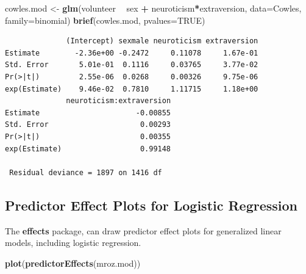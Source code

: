 \documentclass[
]{article}
\newenvironment{Shaded}{\begin{snugshade}}{\end{snugshade}}
\newcommand{\DataTypeTok}[1]{\textcolor[rgb]{0.13,0.29,0.53}{#1}}
\newcommand{\KeywordTok}[1]{\textcolor[rgb]{0.13,0.29,0.53}{\textbf{#1}}}
\newcommand{\NormalTok}[1]{#1}
\newcommand{\OperatorTok}[1]{\textcolor[rgb]{0.81,0.36,0.00}{\textbf{#1}}}
\newcommand{\OtherTok}[1]{\textcolor[rgb]{0.56,0.35,0.01}{#1}}
\newcommand{\StringTok}[1]{\textcolor[rgb]{0.31,0.60,0.02}{#1}}
\begin{document}
\begin{Shaded}
\begin{Highlighting}[]
\NormalTok{cowles.mod <-}\StringTok{ }\KeywordTok{glm}\NormalTok{(volunteer }\OperatorTok{~}\StringTok{ }\NormalTok{sex }\OperatorTok{+}\StringTok{ }\NormalTok{neuroticism}\OperatorTok{*}\NormalTok{extraversion,}
    \DataTypeTok{data=}\NormalTok{Cowles, }\DataTypeTok{family=}\NormalTok{binomial)}
\KeywordTok{brief}\NormalTok{(cowles.mod, }\DataTypeTok{pvalues=}\OtherTok{TRUE}\NormalTok{)}
\end{Highlighting}
\end{Shaded}

\begin{verbatim}
              (Intercept) sexmale neuroticism extraversion
Estimate        -2.36e+00 -0.2472     0.11078     1.67e-01
Std. Error       5.01e-01  0.1116     0.03765     3.77e-02
Pr(>|t|)         2.55e-06  0.0268     0.00326     9.75e-06
exp(Estimate)    9.46e-02  0.7810     1.11715     1.18e+00
              neuroticism:extraversion
Estimate                      -0.00855
Std. Error                     0.00293
Pr(>|t|)                       0.00355
exp(Estimate)                  0.99148

 Residual deviance = 1897 on 1416 df
\end{verbatim}

\hypertarget{predictor-effect-plots-for-logistic-regression}{%
\subsection{Predictor Effect Plots for Logistic
Regression}\label{predictor-effect-plots-for-logistic-regression}}

The \textbf{effects} package, can draw predictor effect plots for
generalized linear models, including logistic regression.

\begin{Shaded}
\begin{Highlighting}[]
\KeywordTok{plot}\NormalTok{(}\KeywordTok{predictorEffects}\NormalTok{(mroz.mod))}
\end{Highlighting}
\end{Shaded}
\end{document}
